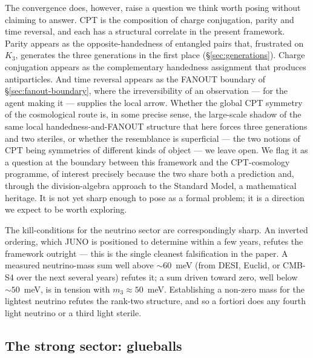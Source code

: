 The convergence does, however, raise a question we think worth posing without claiming to answer.
CPT is the composition of charge conjugation, parity and time reversal, and each has a structural
correlate in the present framework. Parity appears as the opposite-handedness of entangled pairs
that, frustrated on $K_3$, generates the three generations in the first place
(\S\ref{sec:generations}). Charge conjugation appears as the complementary handedness assignment
that produces antiparticles. And time reversal appears as the FANOUT boundary of
\S\ref{sec:fanout-boundary}, where the irreversibility of an observation --- for the agent making it
--- supplies the local arrow. Whether the global CPT symmetry of the cosmological route is, in some
precise sense, the large-scale shadow of the same local handedness-and-FANOUT structure that here
forces three generations and two steriles, or whether the resemblance is superficial --- the two
notions of CPT being symmetries of different kinds of object --- we leave open. We flag it as a
question at the boundary between this framework and the CPT-cosmology programme, of interest
precisely because the two share both a prediction and, through the division-algebra approach to the
Standard Model, a mathematical heritage. It is not yet sharp enough to pose as a formal problem; it
is a direction we expect to be worth exploring.

The kill-conditions for the neutrino sector are correspondingly sharp. An inverted ordering, which
JUNO is positioned to determine within a few years, refutes the framework outright --- this is the
single cleanest falsification in the paper. A measured neutrino-mass sum well above $\sim 60$~meV
(from DESI, Euclid, or CMB-S4 over the next several years) refutes it; a sum driven toward zero, well
below $\sim 50$~meV, is in tension with $m_3 \approx 50$~meV. Establishing a non-zero mass for the
lightest neutrino refutes the rank-two structure, and so a fortiori does any fourth light neutrino or
a third light sterile.

\subsection{The strong sector: glueballs}

